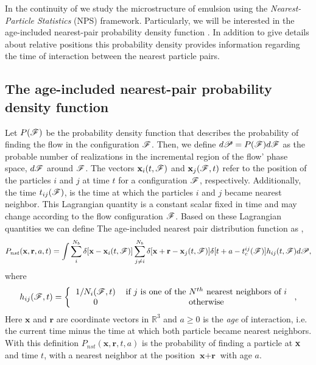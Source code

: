 
In the continuity of \citet{fintzi2024buoyancy} we study the microstructure of emulsion using the \textit{Nearest-Particle Statistics} (NPS) framework. 
Particularly, we will be interested in the age-included nearest-pair probability density function \citep{zhang2021ensemble}. 
In addition to give details about relative positions this probability density provides information regarding the time of interaction between the nearest particle pairs. 

\subsection{The age-included nearest-pair probability density function}
Let $P(\mathscr{F})$ be the probability density function that describes the probability of finding the flow in the configuration $\mathscr{F}$.
Then, we define $d\mathscr{P} = P(\mathscr{F})d\mathscr{F}$ as the probable number of realizations in the incremental region of the flow' phase space, $d\mathscr{F}$ around $\mathscr{F}$.
The vectors  $\textbf{x}_i(t,\mathscr{F})$ and $\textbf{x}_j(\mathscr{F},t)$ refer to the position of the particles $i$ and $j$ at time $t$ for a configuration $\mathscr{F}$, respectively. 
Additionally, the time $t_{ij}(\mathscr{F})$, is the time at which the particles $i$ and $j$ became nearest neighbor.
This Lagrangian quantity is a constant scalar fixed in time and may change according to the flow configuration $\mathscr{F}$.
Based on these Lagrangian quantities we can define The age-included nearest pair distribution function as \citep{zhang2023evolution},
\begin{equation}
    P_{nst}(\textbf{x},\textbf{r},a,t) =
    \int \sum_{i}^{N_b}\delta[\textbf{x}-\textbf{x}_i(t,\mathscr{F})]
    \sum_{j\neq i}^{N_b}\delta[\textbf{x}+\textbf{r}-\textbf{x}_j(t,\mathscr{F})]
    \delta[t+a-t_c^{ij}(\mathscr{F})] 
    h_{ij} (t,\mathscr{F})
    d\mathscr{P},
    \label{eq:P_nstij}
\end{equation}
where
\begin{equation*}
    h_{ij}(\FF,t)
    = \left\{
        \begin{tabular}{cc}
            $1/N_i(\FF,t)$ & if $j$ is one of the $N^{th}$ nearest neighbors of $i$ \\
            0& otherwise
        \end{tabular}
        \right.,
\end{equation*}
Here $\textbf{x}$ and $\textbf{r}$ are coordinate vectors in $\mathbb{R}^3$ and $a \geq 0 $ is the \textit{age} of interaction, i.e. the current time minus the time at which both particle became nearest neighbors.   
With this definition $P_{nst}(\textbf{x},\textbf{r},t,a)$ is the probability of finding a particle at \textbf{x} and time $t$, with a nearest neighbor at the position $\textbf{x}+\textbf{r}$ with age $a$.
